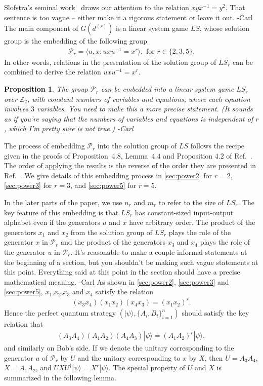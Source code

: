 \documentclass[11pt,letterpaper]{article}
\newcommand{\ket}[1]{|#1\rangle}
\newcommand{\ct}{^{\dagger}}
\newcommand{\Z}{\mathbb{Z}}
\newcommand{\1}{\mathbb{1}}
\newcommand{\Pg}{\mathcal{P}}
\newcommand{\G}{G}
\newcommand{\LS}{LS}
\newcommand{\dr}[1]{d^{(#1)}}
\def\carl#1{{\color{blue} #1 -Carl}}
\newtheorem{proposition}[theorem]{Proposition}
\theoremstyle{definition}
\begin{document}
Slofstra's seminal work~\cite{slofstra2017} draws our attention to the relation $xyx^{-1} = y^2$.  \carl{That sentence
is too vague -- either make it a rigorous statement or leave it out.}
The main component of $\G(\dr{r})$ is a linear system game $\LS$, whose solution group is the embedding of the 
following group
\begin{align}
	\Pg_r= \langle u, x : uxu^{-1} = x^r \rangle, \text{ for } r \in \{2, 3,5\}.
\end{align}
In other words, relations in the presentation of the solution group of $\LS_r$ can be combined to derive the
relation $uxu^{-1} = x^r$.  
\begin{proposition}
	\label{prop:embed}
	The group $\Pg_r$ can be embedded into a linear system game $\LS_r$ over $\Z_2$,
	with constant numbers of variables and equations, where each equation involves $3$ variables.
	\carl{You need to make this a more precise statement.  (It sounds as if you're saying 
	that the numbers of variables and equations is independent of $r$, which I'm pretty sure is not true.)}
\end{proposition}
The process of embedding $\Pg_r$ into the solution group of $\LS$ follows the recipe given in the proofs of
Proposition~$4.8$, Lemma~$4.4$ and Proposition $4.2$ of Ref.~\cite{slofstra2017}.
The order of applying the results is the reverse of the order they are presented in Ref.~\cite{slofstra2017}.
We give details of this embedding process in \cref{sec:power2} for $r = 2$, \cref{sec:power3} for $r = 3$, 
and \cref{sec:power5} for $r = 5$. 

In the later parts of the paper, we use $n_r$ and $m_r$ to refer to the size of $\LS_r$.
The key feature of this embedding is that $\LS_r$ has constant-sized input-output alphabet
even if the generators $u$ and $x$ have arbitrary order. 
The product of the generators $x_1$ and $x_2$ from the solution group of $\LS_r$ plays the role 
of the generator $x$ in $\Pg_r$ and the product of the generators $x_3$ and $x_4$ plays the role
of the generator $u$ in $\Pg_r$.   \carl{It's reasonable to make a couple informal statements
at the beginning of a section, but you shouldn't be making
such vague statements at this point.  Everything said at this point in the section should have a precise mathematical
meaning.}
As shown in \cref{sec:power2}, \cref{sec:power3} and \cref{sec:power5}, 
$x_1$,$x_2$,$x_3$ and $x_4$ satisfy the relation
\begin{align}
	(x_3x_4)(x_1x_2)(x_4x_3) = (x_1x_2)^r.
\end{align}
Hence the perfect quantum strategy $(\ket{\psi}, \{A_i, B_i\}_{i=1}^n)$ should satisfy 
the key relation that 
\begin{align}
	(A_3A_4) (A_1A_2)(A_4A_3) \ket{\psi} = (A_1A_2)^r\ket{\psi}, 
\end{align}
and similarly on Bob's side.
If we denote the unitary corresponding to the generator $u$ of $\Pg_r$ by $U$ and the unitary
corresponding to $x$ by $X$, then $U = A_3A_4$, $X= A_1A_2$, and 
$UXU\ct \ket{\psi} = X^r \ket{\psi}$.
The special property of $U$ and $X$ is summarized in the following lemma. 
\end{document}
